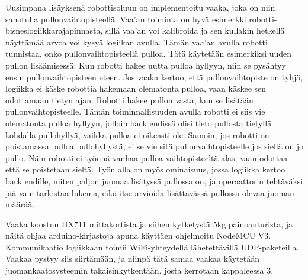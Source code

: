 Uusimpana lisäyksenä robottisoluun on implementoitu vaaka, joka on niin sanotulla pullonvaihtopisteellä. Vaa'an toiminta on hyvä esimerkki robotti-bisneslogiikkarajapinnasta, sillä vaa'an voi kalibroida ja sen kullakin hetkellä näyttämää arvoa voi kysyä logiikan avulla. Tämän vaa'an avulla robotti tunnistaa, onko pullonvaihtopisteellä pulloa. Tätä käytetään esimerkiksi uuden pullon lisäämisessä: Kun robotti hakee uutta pulloa hyllyyn, niin se pysähtyy ensin pullonvaihtopisteen eteen. Jos vaaka kertoo, että pullonvaihtopiste on tyhjä, logiikka ei käske robottia hakemaan olematonta pulloa, vaan käskee sen odottamaan tietyn ajan. Robotti hakee pullon vasta, kun se lisätään pullonvaihtopisteelle. Tämän toiminnallisuuden avulla robotti ei siis vie olematonta pulloa hyllyyn, jolloin back endissä olisi tieto pullosta tietyllä kohdalla pullohyllyä, vaikka pulloa ei oikeasti ole. Samoin, jos robotti on poistamassa pulloa pullohyllystä, ei se vie sitä pullonvaihtopisteelle jos siellä on jo pullo. Näin robotti ei työnnä vanhaa pulloa vaihtopisteeltä alas, vaan odottaa että se poistetaan sieltä. Työn alla on myös ominaisuus, jossa logiikka kertoo back endille, miten paljon juomaa lisätyssä pullossa on, ja operaattorin tehtäväksi jää vain tarkistaa lukema, eikä itse arvioida lisättävässä pullossa olevaa juoman määrää.

Vaaka koostuu HX711 mittakortista ja siihen kytketystä 5kg painoanturista, ja näitä ohjaa arduino-kirjastoja apuna käyttäen ohjelmoitu NodeMCU V3. Kommunikaatio logiikkaan toimii WiFi-yhteydellä lähetettävillä UDP-paketeilla. Vaakaa pystyy siis siirtämään, ja niinpä tätä samaa vaakaa käytetään juomankaatosysteemin takaisinkytkentään, josta kerrotaan kappaleessa 3.

